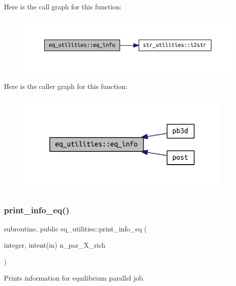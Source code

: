 Here is the call graph for this function\+:\nopagebreak
\begin{figure}[H]
\begin{center}
\leavevmode
\includegraphics[width=350pt]{namespaceeq__utilities_a34c5ddab45a54a6c738e5e0b8c7d55d6_cgraph}
\end{center}
\end{figure}
Here is the caller graph for this function\+:\nopagebreak
\begin{figure}[H]
\begin{center}
\leavevmode
\includegraphics[width=300pt]{namespaceeq__utilities_a34c5ddab45a54a6c738e5e0b8c7d55d6_icgraph}
\end{center}
\end{figure}
\mbox{\label{namespaceeq__utilities_a40f397d20b45432117744ca16870ddbb}} 
\subsubsection{\texorpdfstring{print\+\_\+info\+\_\+eq()}{print\_info\_eq()}}
{\footnotesize\ttfamily subroutine, public eq\+\_\+utilities\+::print\+\_\+info\+\_\+eq (\begin{DoxyParamCaption}\item[{integer, intent(in)}]{n\+\_\+par\+\_\+\+X\+\_\+rich }\end{DoxyParamCaption})}



Prints information for equilibrium parallel job. 


